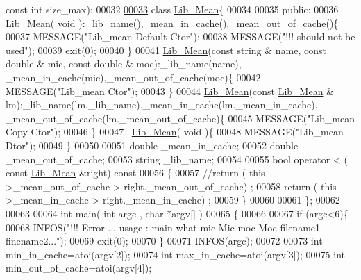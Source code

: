 \begin{DoxyCode}
{      const} \textcolor{keywordtype}{int} size\_max);
00032 
\hyperlink{class_lib___mean}{00033} \textcolor{keyword}{class }\hyperlink{class_lib___mean}{Lib\_Mean}\{
00034 
00035 \textcolor{keyword}{public}:
00036   \hyperlink{class_lib___mean}{Lib\_Mean}( \textcolor{keywordtype}{void} ):\_lib\_name(),\_mean\_in\_cache(),\_mean\_out\_of\_cache()\{
00037     MESSAGE(\textcolor{stringliteral}{"Lib\_mean Default Ctor"});
00038     MESSAGE(\textcolor{stringliteral}{"!!! should not be used"});
00039     exit(0);
00040   \}
00041   \hyperlink{class_lib___mean}{Lib\_Mean}(\textcolor{keyword}{const} \textcolor{keywordtype}{string} & name, \textcolor{keyword}{const} \textcolor{keywordtype}{double} & mic, \textcolor{keyword}{const} \textcolor{keywordtype}{double} & moc):\_lib\_name(name),
      \_mean\_in\_cache(mic),\_mean\_out\_of\_cache(moc)\{
00042     MESSAGE(\textcolor{stringliteral}{"Lib\_mean Ctor"});
00043   \}
00044   \hyperlink{class_lib___mean}{Lib\_Mean}(\textcolor{keyword}{const} \hyperlink{class_lib___mean}{Lib\_Mean} & lm):\_lib\_name(lm.\_lib\_name),\_mean\_in\_cache(lm.\_mean\_in\_cache),
      \_mean\_out\_of\_cache(lm.\_mean\_out\_of\_cache)\{
00045     MESSAGE(\textcolor{stringliteral}{"Lib\_mean Copy Ctor"});
00046   \}
00047   ~\hyperlink{class_lib___mean}{Lib\_Mean}( \textcolor{keywordtype}{void} )\{
00048     MESSAGE(\textcolor{stringliteral}{"Lib\_mean Dtor"});
00049   \}
00050     
00051   \textcolor{keywordtype}{double} \_mean\_in\_cache;
00052   \textcolor{keywordtype}{double} \_mean\_out\_of\_cache;
00053   \textcolor{keywordtype}{string} \_lib\_name;
00054 
00055   \textcolor{keywordtype}{bool} operator < ( \textcolor{keyword}{const} \hyperlink{class_lib___mean}{Lib\_Mean} &right)\textcolor{keyword}{ const }
00056 \textcolor{keyword}{  }\{
00057     \textcolor{comment}{//return ( this->\_mean\_out\_of\_cache > right.\_mean\_out\_of\_cache) ;}
00058     \textcolor{keywordflow}{return} ( this->\_mean\_in\_cache > right.\_mean\_in\_cache) ;
00059   \}
00060 
00061 \}; 
00062 
00063 
00064 \textcolor{keywordtype}{int} main( \textcolor{keywordtype}{int} argc , \textcolor{keywordtype}{char} *argv[] )
00065 \{
00066 
00067   \textcolor{keywordflow}{if} (argc<6)\{
00068     INFOS(\textcolor{stringliteral}{"!!! Error ... usage : main what mic Mic moc Moc filename1 finename2..."});
00069     exit(0);
00070   \}
00071   INFOS(argc);
00072 
00073   \textcolor{keywordtype}{int} min\_in\_cache=atoi(argv[2]);
00074   \textcolor{keywordtype}{int} max\_in\_cache=atoi(argv[3]);
00075   \textcolor{keywordtype}{int} min\_out\_of\_cache=atoi(argv[4]);

\end{DoxyCode}
